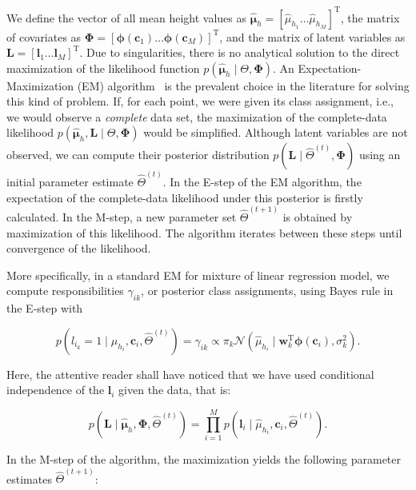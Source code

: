 We define the vector of all mean height values as $\hat{\boldsymbol\mu}_h=
[\hat{\mu}_{h_1}\dots\hat{\mu}_{h_M}]^\text{T}$, the matrix of covariates as
$\boldsymbol{\Phi}=[\boldsymbol{\phi}(\mathbf{c}_1)\dots\boldsymbol{\phi}
(\mathbf{c}_{M})]^\text{T}$, and the matrix of latent variables as
$\mathbf{L}=[\mathbf{l}_1\dots\mathbf{l}_M]^\text{T}$. Due to singularities,
there is no analytical solution to the direct maximization of the likelihood
function $p(\hat{\boldsymbol\mu}_h\mid\Theta,\boldsymbol{\Phi})$. An
Expectation-Maximization (EM) algorithm~\cite{dempster77maximum} is the
prevalent choice in the literature for solving this kind of problem. If, for
each point, we were given its class assignment, i.e., we would observe a
\emph{complete} data set, the maximization of the complete-data likelihood
$p(\hat{\boldsymbol\mu}_h,\mathbf{L}\mid\Theta,\boldsymbol{\Phi})$ would be
simplified. Although latent variables are not observed, we can compute their
posterior distribution $p(\mathbf{L}\mid\hat{\Theta}^{(t)},\boldsymbol{\Phi})$
using an initial parameter estimate $\hat{\Theta}^{(t)}$. In the E-step of
the EM algorithm, the expectation of the complete-data likelihood under this
posterior is firstly calculated. In the M-step, a new parameter set
$\hat{\Theta}^{(t+1)}$ is obtained by maximization of this likelihood.
The algorithm iterates between these steps until convergence of the likelihood.

More specifically, in a standard EM for mixture of linear regression model, we
compute responsibilities $\gamma_{ik}$, or posterior class assignments, using
Bayes rule in the E-step with

\begin{equation}
\label{eqn:responsibility}
p(l_{i_k}=1\mid\hat{\mu}_{h_i},\mathbf{c}_i,\hat{\Theta}^{(t)})=\gamma_{ik}
\propto\pi_k\mathcal{N}(\hat{\mu}_{h_i}\mid\mathbf{w}_k^\text{T}
\boldsymbol{\phi}(\mathbf{c}_i),\sigma^2_k).
\end{equation}

Here, the attentive reader shall have noticed that we have used conditional
independence of the $\mathbf{l}_i$ given the data, that is:

\begin{equation}
\label{eqn:factorization}
p(\mathbf{L}\mid\hat{\boldsymbol\mu}_h,\boldsymbol{\Phi},\hat{\Theta}^{(t)})
=\prod_{i=1}^M p(\mathbf{l}_i\mid\hat{\mu}_{h_i},\mathbf{c}_i,
\hat{\Theta}^{(t)}).
\end{equation}

In the M-step of the algorithm, the maximization yields the following parameter
estimates $\hat{\Theta}^{(t+1)}$:

